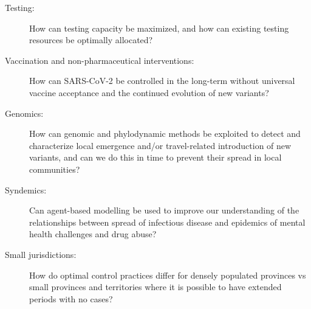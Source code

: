 \begin{description}

\item[Testing:]How can testing capacity be maximized, and how can
existing testing resources be optimally allocated?

\item[Vaccination and non-pharmaceutical interventions:]How can
SARS-CoV-2 be controlled in the long-term without universal vaccine
acceptance and the continued evolution of new variants?

\item[Genomics:]How can genomic and phylodynamic methods be exploited
to detect and characterize local emergence and/or travel-related
introduction of new variants, and can we do this in time to prevent
their spread in local communities?

\item[Syndemics:]Can agent-based modelling be used to improve our
understanding of the relationships between spread of infectious
disease and epidemics of mental health challenges and drug abuse?

\item[Small jurisdictions:]How do optimal control practices differ for
densely populated provinces vs small provinces and territories where
it is possible to have extended periods with no cases?

\end{description}

